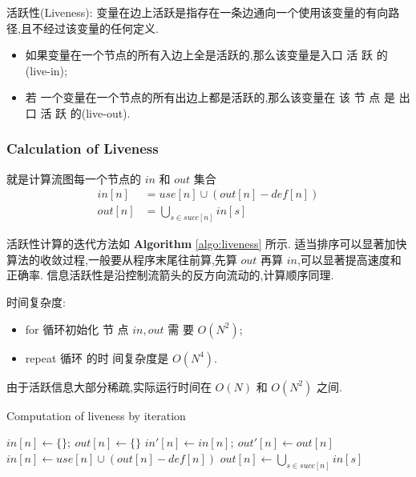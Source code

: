 活跃性(Liveness): 变量在边上活跃是指存在一条边通向一个使用该变量的有向路径,且不经过该变量的任何定义.
\begin{itemize}
    \item 如果变量在一个节点的所有入边上全是活跃的,那么该变量是入口 活 跃 的 (live-in); 
    \item 若 一个变量在一个节点的所有出边上都是活跃的,那么该变量在 该 节 点 是 出 口 活 跃 的(live-out).
\end{itemize}

\subsubsection{Calculation of Liveness}
就是计算流图每一个节点的 $in$ 和 $out$ 集合
\begin{equation}
    \begin{split}
        in[n]&=use[n]\cup (out[n]-def[n])\\
        out[n]&=\bigcup_{s\in succ[n]}in[s]
    \end{split}\label{eq:liveness}
\end{equation}


活跃性计算的迭代方法如 \textbf{Algorithm} \ref{algo:liveness} 所示. 适当排序可以显著加快算法的收敛过程,一般要从程序末尾往前算,先算 $out$ 再算 $in$,可以显著提高速度和正确率. 信息活跃性是沿控制流箭头的反方向流动的,计算顺序同理.


时间复杂度: 
\begin{itemize}
    \item for 循环初始化 节 点 $in,out$ 需 要 $O(N^2)$; 
    \item repeat 循环 的时 间复杂度是 $O(N^4)$.
\end{itemize}
由于活跃信息大部分稀疏,实际运行时间在 $O(N)$ 和 $O(N^2)$ 之间.

\begin{algorithm}[H]
    \caption{Computation of liveness by iteration}
    \label{algo:liveness}
    \begin{algorithmic}
            \State $in[n]\leftarrow \{\};\ out[n]\leftarrow \{\}$
        \EndFor
        \Repeat
                \State $in'[n]\leftarrow in[n];\ out'[n]\leftarrow out[n]$
                \State $in[n]\leftarrow use[n] \cup (out[n] - def[n])$
                \State $\displaystyle out[n]\leftarrow \bigcup_{s\in succ[n]}in[s]$
            \EndFor
    \end{algorithmic}
\end{algorithm}

